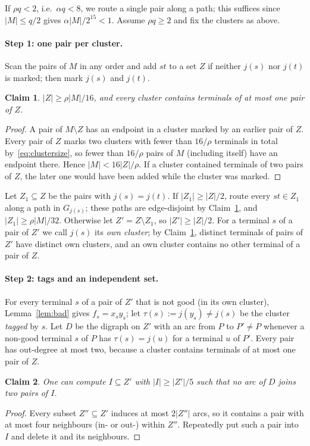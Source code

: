 \documentclass[11pt,letterpaper]{article}
\newtheorem{claim}{Claim}
\theoremstyle{definition}
\begin{document}
If $\rho q<2$, i.e.\ $\alpha q<8$, we route a single pair along a path; this suffices since
$|M|\le q/2$ gives $\alpha|M|/2^{15}<1$. Assume $\rho q\ge2$ and fix the clusters as above.

\paragraph{Step 1: one pair per cluster.}
Scan the pairs of $M$ in any order and add $st$ to a set $Z$ if neither $j(s)$ nor $j(t)$ is
marked; then mark $j(s)$ and $j(t)$.

\begin{claim}\label{cl:Z}
$|Z|\ge\rho|M|/16$, and every cluster contains terminals of at most one pair of $Z$.
\end{claim}
\begin{proof}
A pair of $M\setminus Z$ has an endpoint in a cluster marked by an earlier pair of $Z$.
Every pair of $Z$ marks two clusters with fewer than $16/\rho$ terminals in total
by~\eqref{eq:clustersize}, so fewer than $16/\rho$ pairs of $M$ (including itself) have an
endpoint there. Hence $|M|<16|Z|/\rho$. If a cluster contained terminals of two pairs of
$Z$, the later one would have been added while the cluster was marked.
\end{proof}

Let $Z_1\subseteq Z$ be the pairs with $j(s)=j(t)$. If $|Z_1|\ge|Z|/2$, route every
$st\in Z_1$ along a path in $G_{j(s)}$; these paths are edge-disjoint by
Claim~\ref{cl:Z}, and $|Z_1|\ge\rho|M|/32$. Otherwise let $Z'=Z\setminus Z_1$, so
$|Z'|\ge|Z|/2$. For a terminal $s$ of a pair of $Z'$ we call $j(s)$ its \emph{own cluster};
by Claim~\ref{cl:Z}, distinct terminals of pairs of $Z'$ have distinct own clusters, and an
own cluster contains no other terminal of a pair of $Z$.

\paragraph{Step 2: tags and an independent set.}
For every terminal $s$ of a pair of $Z'$ that is not good (in its own cluster),
Lemma~\ref{lem:bad} gives $f_s=x_sy_s$; let $\tau(s):=j(y_s)\ne j(s)$ be the cluster
\emph{tagged} by $s$. Let $D$ be the digraph on $Z'$ with an arc from $P$ to $P'\ne P$
whenever a non-good terminal $s$ of $P$ has $\tau(s)=j(u)$ for a terminal $u$ of $P'$. Every
pair has out-degree at most two, because a cluster contains terminals of at most one pair of
$Z$.

\begin{claim}\label{cl:I}
One can compute $I\subseteq Z'$ with $|I|\ge|Z'|/5$ such that no arc of $D$ joins two pairs
of $I$.
\end{claim}
\begin{proof}
Every subset $Z''\subseteq Z'$ induces at most $2|Z''|$ arcs, so it contains a pair with at most
four neighbours (in- or out-) within $Z''$. Repeatedly put such a pair into $I$ and delete it
and its neighbours.
\end{proof}
\end{document}
